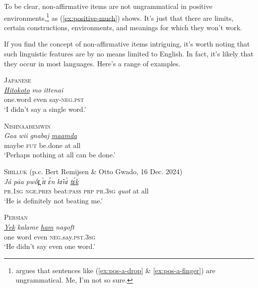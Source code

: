 To be clear, non-affirmative items are not ungrammatical in  positive environments,\footnote{\citet[3--4]{Israel2011} argues that sentences like  (\ref{ex:pos-a-drop} \& \ref{ex:pos-a-finger}) are ungrammatical. Me, I'm not so sure.} as (\ref{ex:positive-much}) shows. It's just that there are limits, certain constructions, environments, and meanings for which they won't work.

\ea \label{ex:positive-much}
    \z
\z

\begin{tcolorbox}[title=Non-affirmative items in other languages, colback=white]
If you find the concept of non-affirmative items intriguing, it's worth noting that such linguistic features are by no means limited to English. In fact, it's likely that they occur in most languages. Here's a range of examples.

\ea \textsc{Japanese}\\
\gll \textit{\uline{Hitokoto}} \textit{mo} \textit{ittenai}\\
     one.word even say-\textsc{neg.pst} \\
\glt `I didn't say a single word.'
\z

\ea \textsc{Nishnaabemwin} \citep[843]{Valentine2001}\\
\gll \textit{Gaa} \textit{wii} \textit{gnabaj} \textit{\uline{maamda}}\\
     maybe \textsc{fut} be.done {at all}\\
\glt `Perhaps nothing at all can be done.'
\z

\ea \textsc{Shilluk} (p.c. Bert Remijsen \& Otto Gwado, 16 Dec. 2024)\\
\gll \textit{Já} \textit{pāa} \textit{pwốt̪} \textit{ɪ̀ɪ} \textit{ɛ́n} \textit{kɪ̂nɪ̀} \textit{\uline{tɛ́k}}\\
     \textsc{pr.1sg} \textsc{nge.pres} beat:\textsc{pass} \textsc{prp} \textsc{pr.3sg} \textit{quot} {at all}\\
\glt `He is definitely not beating me.'
\z

\ea \textsc{Persian}\\
\gll \textit{\uline{Yek}} \textit{kalame} \textit{\uline{ham}} \textit{nagoft}\\
     one word even \textsc{neg}.say.\textsc{pst.3sg}\\
\glt `He didn't say even one word.'
\z


\end{tcolorbox}
